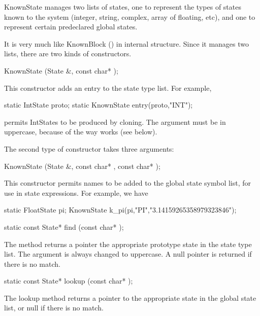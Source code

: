 KnownState manages two lists of states, one to represent the types of
states known to the system (integer, string, complex, array of floating,
etc), and one to represent certain predeclared global states.

It is very much like KnownBlock ()
in internal structure.  Since it manages
two lists, there are two kinds of constructors.

\begin{example}
KnownState (State &, const char* );
\end{example}

This constructor adds an entry to the state type list.  For example,

\begin{example}
static IntState proto;
static KnownState entry(proto,"INT");
\end{example}

permits IntStates to be produced by cloning.  The  argument
must be in uppercase, because of the way  works (see below).

The second type of constructor takes three arguments:

\begin{example}
KnownState (State &, const char* , const char* );
\end{example}

This constructor permits names to be added to the global state symbol
list, for use in state expressions.  For example, we have

\begin{example}
static FloatState pi;
KnownState k_pi(pi,"PI","3.14159265358979323846");
\end{example}

\begin{example}
static const State* find (const char* );
\end{example}

The  method returns a pointer the appropriate prototype
state in the state type list.  The argument is always changed to
uppercase.  A null pointer is returned if there is no match.

\begin{example}
static const State* lookup (const char* );
\end{example}

The lookup method returns a pointer to the appropriate state in
the global state list, or null if there is no match.


